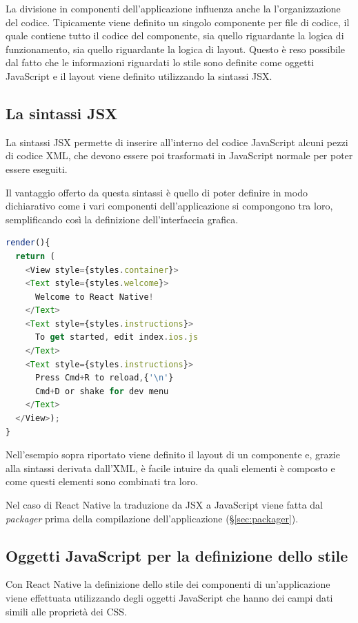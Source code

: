 La divisione in componenti dell'applicazione influenza anche la l'organizzazione del codice. Tipicamente viene definito un singolo componente per file di codice, il quale contiene tutto il codice del componente, sia quello riguardante la logica di funzionamento, sia quello riguardante la logica di layout.
Questo è reso possibile dal fatto che le informazioni riguardati lo stile sono definite come oggetti JavaScript e il layout viene definito utilizzando la sintassi JSX.

\subsection{La sintassi JSX}

La sintassi JSX permette di inserire all'interno del codice JavaScript alcuni pezzi di codice XML, che devono essere poi trasformati in JavaScript normale per poter essere eseguiti.

Il vantaggio offerto da questa sintassi è quello di poter definire in modo dichiarativo come i vari componenti dell'applicazione si compongono tra loro, semplificando così la definizione dell'interfaccia grafica.

\begin{lstlisting}[language=JavaScript, caption=Esempio della sintassi JSX di React Native]
render(){
  return (
    <View style={styles.container}>
    <Text style={styles.welcome}>
      Welcome to React Native!
    </Text>
    <Text style={styles.instructions}>
      To get started, edit index.ios.js
    </Text>
    <Text style={styles.instructions}>
      Press Cmd+R to reload,{'\n'}
      Cmd+D or shake for dev menu
    </Text>
  </View>);
}
\end{lstlisting}

Nell'esempio sopra riportato viene definito il layout di un componente e, grazie alla sintassi derivata dall'XML, è facile intuire da quali elementi è composto e come questi elementi sono combinati tra loro.     

Nel caso di React Native la traduzione da JSX a JavaScript viene fatta dal \textit{packager} prima della compilazione dell'applicazione (§\ref{sec:packager}).

\subsection{Oggetti JavaScript per la definizione dello stile}

Con React Native la definizione dello stile dei componenti di un'applicazione viene effettuata utilizzando degli oggetti JavaScript che hanno dei campi dati simili alle proprietà dei CSS.


